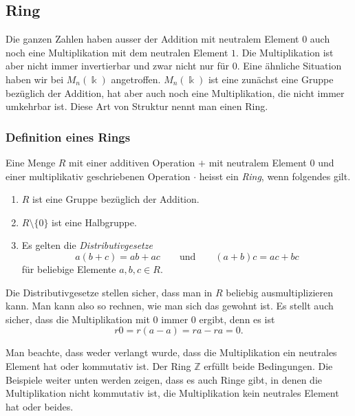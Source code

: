 %
%
%
\subsection{Ring
\label{buch:grundlagen:subsection:ringe}}
Die ganzen Zahlen haben ausser der Addition mit neutralem Element $0$
auch noch eine Multiplikation mit dem neutralen Element $1$.
Die Multiplikation ist aber nicht immer invertierbar und zwar
nicht nur für $0$.
Eine ähnliche Situation haben wir bei $M_n(\Bbbk)$ angetroffen.
$M_n(\Bbbk)$ ist eine zunächst eine Gruppe bezüglich der Addition,
hat aber auch noch eine Multiplikation, die nicht immer umkehrbar ist.
Diese Art von Struktur nennt man einen Ring.

\subsubsection{Definition eines Rings}

\begin{definition}
%
Eine Menge $R$ mit einer additiven Operation $+$ mit neutralem Element
$0$ und einer multiplikativ geschriebenen Operation $\cdot$ heisst ein
{\em Ring}, wenn folgendes gilt.
%
\begin{enumerate}
\item
$R$ ist eine Gruppe bezüglich der Addition.
\item
$R\setminus\{0\}$ ist eine Halbgruppe.
\item
Es gelten die {\em Distributivgesetze}
\[
a(b+c)=ab+ac
\qquad\text{und}\qquad
(a+b)c=ac+bc
\]
für beliebige Elemente $a,b,c\in R$.
%
\end{enumerate}
\end{definition}

Die Distributivgesetze stellen sicher, dass man in $R$ beliebig
ausmultiplizieren kann.
Man kann also so rechnen, wie man sich das gewohnt ist.
Es stellt auch sicher, dass die Multiplikation mit $0$ immer $0$
ergibt, denn es ist
\[
r0 = r(a-a) = ra-ra=0.
\]

Man beachte, dass weder verlangt wurde, dass die Multiplikation
ein neutrales Element hat oder kommutativ ist.
Der Ring $\mathbb{Z}$ erfüllt beide Bedingungen.
Die Beispiele weiter unten werden zeigen, dass es auch Ringe gibt,
in denen die Multiplikation nicht kommutativ ist, die Multiplikation
kein neutrales Element hat oder beides.

